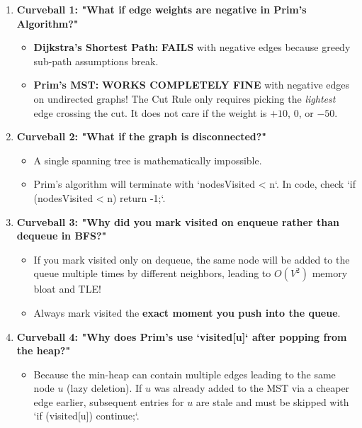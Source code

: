 \documentclass[10pt,journal,compsoc,onecolumn]{IEEEtran}
\begin{document}
\begin{enumerate}
    \item \textbf{Curveball 1: "What if edge weights are negative in Prim's Algorithm?"}
    \begin{itemize}
        \item \textbf{Dijkstra's Shortest Path:} \textbf{FAILS} with negative edges because greedy sub-path assumptions break.
        \item \textbf{Prim's MST:} \textbf{WORKS COMPLETELY FINE} with negative edges on undirected graphs! The Cut Rule only requires picking the \emph{lightest} edge crossing the cut. It does not care if the weight is $+10$, $0$, or $-50$.
    \end{itemize}

    \item \textbf{Curveball 2: "What if the graph is disconnected?"}
    \begin{itemize}
        \item A single spanning tree is mathematically impossible.
        \item Prim's algorithm will terminate with `nodesVisited < n`. In code, check `if (nodesVisited < n) return -1;`.
    \end{itemize}

    \item \textbf{Curveball 3: "Why did you mark visited on enqueue rather than dequeue in BFS?"}
    \begin{itemize}
        \item If you mark visited only on dequeue, the same node will be added to the queue multiple times by different neighbors, leading to $O(V^2)$ memory bloat and TLE!
        \item Always mark visited the \textbf{exact moment you push into the queue}.
    \end{itemize}

    \item \textbf{Curveball 4: "Why does Prim's use `visited[u]` after popping from the heap?"}
    \begin{itemize}
        \item Because the min-heap can contain multiple edges leading to the same node $u$ (lazy deletion). If $u$ was already added to the MST via a cheaper edge earlier, subsequent entries for $u$ are stale and must be skipped with `if (visited[u]) continue;`.
    \end{itemize}
\end{enumerate}
\end{document}
